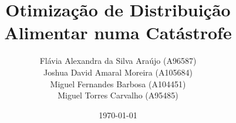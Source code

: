 



\title{\LARGE{Otimização de Distribuição Alimentar numa Catástrofe}}

\author{
    Flávia Alexandra da Silva Araújo (A96587)\\ \quad
    Joshua David Amaral Moreira (A105684)\\ \quad
    Miguel Fernandes Barbosa (A104451)\\ \quad
    Miguel Torres Carvalho (A95485)\\ \quad
}

\date{\today}

\newcommand{\Course}{Licenciatura em Engenharia Informática}

\newcommand{\Department}{Escola de Engenharia}

\newcommand{\UniName}{Universidade do Minho}

\newcommand{\UniPic}{\texttt{[image: img/eeum.png]}}

\newcommand{\University}{
    \begin{flushleft}
         \UniPic   
    \end{flushleft}
    \textcolor{gray}{\small\textbf{\textsf{\UniName}}}\par
    \textcolor{gray!80!white}{\small{\textsf{\Department}}}\par
    \textcolor{gray!70!white}{\small{\textsf{\Course}}}
}

\newcommand{\UC}{
    \begin{flushleft}
        \par\textcolor{titlepagecolor}{\Large\textbf{\textsf{Inteligência Artificial}}}
    \end{flushleft}
}

